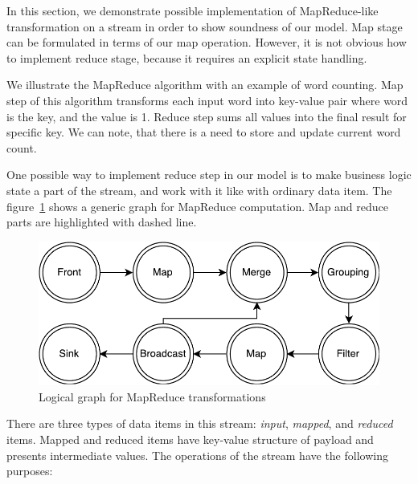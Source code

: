 
\label {fs-mapreduce}

In this section, we demonstrate possible implementation of MapReduce-like transformation on a stream in order to show soundness of our model. Map stage can be formulated in terms of our map operation. However, it is not obvious how to implement reduce stage, because it requires an explicit state handling. 

We illustrate the MapReduce algorithm with an example of word counting. Map step of this algorithm transforms each input word into key-value pair where word is the key, and the value is 1. Reduce step sums all values into the final result for specific key. We can note, that there is a need to store and update current word count.

One possible way to implement reduce step in our model is to make business logic state a part of the stream, and work with it like with ordinary data item. The figure~\ref{mapreduce-graph-figure} shows a generic graph for MapReduce computation. Map and reduce parts are highlighted with dashed line.

\begin{figure}[htb]
  \centering
  \includegraphics[scale=0.5]{pics/mapreduce}
  \caption{Logical graph for MapReduce transformations}
  \label {mapreduce-graph-figure}
\end{figure}

There are three types of data items in this stream: {\it input}, {\it mapped}, and {\it reduced} items. Mapped and reduced items have key-value structure of payload and presents intermediate values. The operations of the stream have the following purposes:

